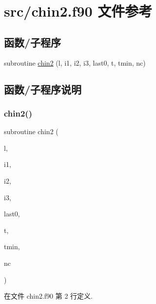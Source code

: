 \hypertarget{chin2_8f90}{}\section{src/chin2.f90 文件参考}
\label{chin2_8f90}
\subsection*{函数/子程序}
\begin{DoxyCompactItemize}
\item 
subroutine \mbox{\hyperlink{chin2_8f90_a5e5eadb43f002556a151d1c70dd43ca9}{chin2}} (l, i1, i2, i3, last0, t, tmin, nc)
\end{DoxyCompactItemize}


\subsection{函数/子程序说明}
\mbox{\label{chin2_8f90_a5e5eadb43f002556a151d1c70dd43ca9}} 
\subsubsection{\texorpdfstring{chin2()}{chin2()}}
{\footnotesize\ttfamily subroutine chin2 (\begin{DoxyParamCaption}\item[{}]{l,  }\item[{}]{i1,  }\item[{}]{i2,  }\item[{}]{i3,  }\item[{}]{last0,  }\item[{}]{t,  }\item[{}]{tmin,  }\item[{}]{nc }\end{DoxyParamCaption})}



在文件 chin2.\+f90 第 2 行定义.

